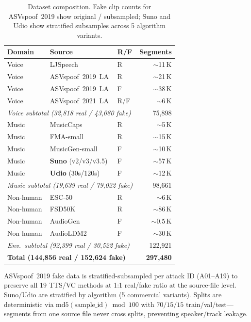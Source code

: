 \documentclass[10pt,twocolumn,a4paper]{article}
\begin{document}
\begin{table}[t]
\centering
\caption{Dataset composition. Fake clip counts for ASVspoof~2019 show original / subsampled; Suno and Udio show stratified subsamples across 5 algorithm variants.}
\label{tab:data}
\small
\begin{tabular}{@{}lllr@{}}
\toprule
\textbf{Domain} & \textbf{Source} & \textbf{R/F} & \textbf{Segments} \\
\midrule
Voice & LJSpeech & R & $\sim$11\,K \\
Voice & ASVspoof~2019~LA & R & $\sim$21\,K \\
Voice & ASVspoof~2019~LA & F & $\sim$38\,K \\
Voice & ASVspoof~2021~LA & R/F & $\sim$6\,K \\
\multicolumn{3}{l}{\textit{Voice subtotal (32,818 real / 43,080 fake)}} & 75{,}898 \\
\midrule
Music & MusicCaps & R & $\sim$5\,K \\
Music & FMA-small & R & $\sim$15\,K \\
Music & MusicGen-small & F & $\sim$10\,K \\
Music & \textbf{Suno} (v2/v3/v3.5) & F & $\sim$57\,K \\
Music & \textbf{Udio} (30s/120s) & F & $\sim$12\,K \\
\multicolumn{3}{l}{\textit{Music subtotal (19,639 real / 79,022 fake)}} & 98{,}661 \\
\midrule
Non-human & ESC-50 & R & $\sim$6\,K \\
Non-human & FSD50K & R & $\sim$86\,K \\
Non-human & AudioGen & F & $\sim$0.5\,K \\
Non-human & AudioLDM2 & F & $\sim$30\,K \\
\multicolumn{3}{l}{\textit{Env.\ subtotal (92,399 real / 30,522 fake)}} & 122{,}921 \\
\midrule
\multicolumn{3}{l}{\textbf{Total (144,856 real / 152,624 fake)}} & \textbf{297{,}480} \\
\bottomrule
\end{tabular}
\end{table}

ASVspoof~2019 fake data is stratified-subsampled per attack ID (A01--A19) to preserve all 19 TTS/VC methods at 1:1 real/fake ratio at the source-file level. Suno/Udio are stratified by algorithm (5 commercial variants). Splits are deterministic via $\text{md5}(\text{sample\_id}) \bmod 100$ with $70/15/15$ train/val/test---segments from one source file never cross splits, preventing speaker/track leakage.
\end{document}
